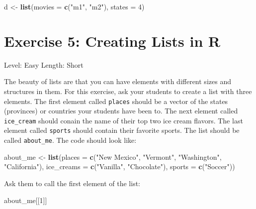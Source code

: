 \documentclass[]{book}
\newenvironment{Shaded}{\begin{snugshade}}{\end{snugshade}}
\newcommand{\DataTypeTok}[1]{\textcolor[rgb]{0.13,0.29,0.53}{#1}}
\newcommand{\DecValTok}[1]{\textcolor[rgb]{0.00,0.00,0.81}{#1}}
\newcommand{\KeywordTok}[1]{\textcolor[rgb]{0.13,0.29,0.53}{\textbf{#1}}}
\newcommand{\NormalTok}[1]{#1}
\newcommand{\StringTok}[1]{\textcolor[rgb]{0.31,0.60,0.02}{#1}}
\begin{document}
\begin{Shaded}
\begin{Highlighting}[]
\NormalTok{d <-}\StringTok{ }\KeywordTok{list}\NormalTok{(}\DataTypeTok{movies =} \KeywordTok{c}\NormalTok{(}\StringTok{"m1"}\NormalTok{, }\StringTok{"m2"}\NormalTok{),}
     \DataTypeTok{states =} \DecValTok{4}\NormalTok{)}
\end{Highlighting}
\end{Shaded}

\hypertarget{exercise-5-creating-lists-in-r}{%
\section*{Exercise 5: Creating Lists in R}\label{exercise-5-creating-lists-in-r}}

Level: Easy
Length: Short

The beauty of lists are that you can have elements with different sizes and structures in them. For this exercise, ask your students to create a list with three elements. The first element called \texttt{places} should be a vector of the states (provinces) or countries your students have been to. The next element called \texttt{ice\_cream} should conain the name of their top two ice cream flavors. The last element called \texttt{sports} should contain their favorite sports. The list should be called \texttt{about\_me}. The code should look like:

\begin{Shaded}
\begin{Highlighting}[]
\NormalTok{about_me <-}\StringTok{ }\KeywordTok{list}\NormalTok{(}\DataTypeTok{places =} \KeywordTok{c}\NormalTok{(}\StringTok{"New Mexico"}\NormalTok{, }\StringTok{"Vermont"}\NormalTok{, }\StringTok{"Washington"}\NormalTok{, }\StringTok{"California"}\NormalTok{),}
                 \DataTypeTok{ice_creams =} \KeywordTok{c}\NormalTok{(}\StringTok{"Vanilla"}\NormalTok{, }\StringTok{"Chocolate"}\NormalTok{),}
                 \DataTypeTok{sports =} \KeywordTok{c}\NormalTok{(}\StringTok{"Soccer"}\NormalTok{))}
\end{Highlighting}
\end{Shaded}

Ask them to call the first element of the list:

\begin{Shaded}
\begin{Highlighting}[]
\NormalTok{about_me[[}\DecValTok{1}\NormalTok{]]}
\end{Highlighting}
\end{Shaded}
\end{document}
